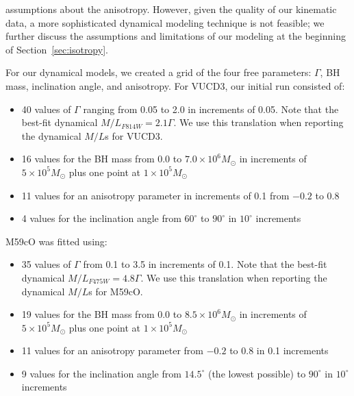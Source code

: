 \documentclass{aastex}
\begin{document}
assumptions about the anisotropy. However, given the quality of our kinematic data, a more sophisticated dynamical modeling technique is not feasible; we further discuss the assumptions and limitations of our modeling at the beginning of Section~\ref{sec:isotropy}.

For our dynamical models, we created a grid of the four free parameters: $\Gamma$, BH mass, inclination angle, and anisotropy. For VUCD3, our initial run consisted of:
\begin{itemize}
\item 40 values of $\Gamma$ ranging from 0.05 to 2.0 in increments of 0.05. Note that the best-fit dynamical $M/L_{F814W} = 2.1 \Gamma$. We use this translation when reporting the dynamical $M/L$s for VUCD3.
\item 16 values for the BH mass from 0.0 to $7.0 \times 10^6 M_\odot$ in increments of $5 \times 10^5 M_\odot$ plus one point at $1 \times 10^5 M_\odot$
\item 11 values for an anisotropy parameter in increments of 0.1 from $-0.2$ to 0.8
\item 4 values for the inclination angle from $60^\circ$ to $90^\circ$ in $10^\circ$ increments
\end{itemize}
M59cO was fitted using:
\begin{itemize}
\item 35 values of $\Gamma$ from 0.1 to 3.5 in increments of 0.1. Note that the best-fit dynamical $M/L_{F475W} = 4.8 \Gamma$. We use this translation when reporting the dynamical $M/L$s for M59cO. 
\item 19 values for the BH mass from 0.0 to $8.5 \times 10^6 M_\odot$ in increments of $5 \times 10^5 M_\odot$ plus one point at $1 \times 10^5 M_\odot$
\item 11 values for an anisotropy parameter from $-0.2$ to 0.8 in 0.1 increments
\item 9 values for the inclination angle from $14.5^\circ$ (the lowest possible) to $90^\circ$ in $10^\circ$ increments
\end{itemize}
\end{document}

